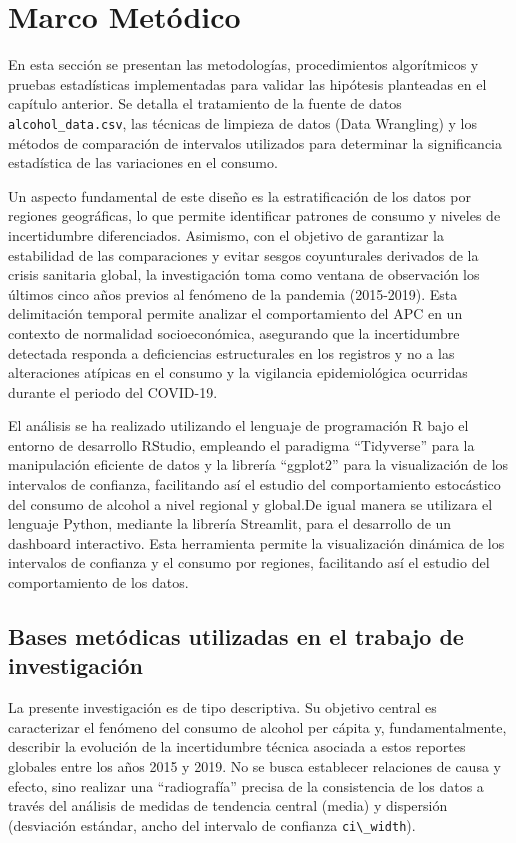 \documentclass[oneside,11pt]{Latex/Classes/PhDthesisPSnPDF}
\begin{document}
\hfill\break

\chapter{Marco Metódico}

En esta sección se presentan las metodologías, procedimientos
algorítmicos y pruebas estadísticas implementadas para validar las
hipótesis planteadas en el capítulo anterior. Se detalla el tratamiento
de la fuente de datos \texttt{alcohol\_data.csv}, las técnicas de
limpieza de datos (Data Wrangling) y los métodos de comparación de
intervalos utilizados para determinar la significancia estadística de
las variaciones en el consumo.

Un aspecto fundamental de este diseño es la estratificación de los datos
por regiones geográficas, lo que permite identificar patrones de consumo
y niveles de incertidumbre diferenciados. Asimismo, con el objetivo de
garantizar la estabilidad de las comparaciones y evitar sesgos
coyunturales derivados de la crisis sanitaria global, la investigación
toma como ventana de observación los últimos cinco años previos al
fenómeno de la pandemia (2015-2019). Esta delimitación temporal permite
analizar el comportamiento del APC en un contexto de normalidad
socioeconómica, asegurando que la incertidumbre detectada responda a
deficiencias estructurales en los registros y no a las alteraciones
atípicas en el consumo y la vigilancia epidemiológica ocurridas durante
el periodo del COVID-19.

El análisis se ha realizado utilizando el lenguaje de programación R
bajo el entorno de desarrollo RStudio, empleando el paradigma
``Tidyverse'' para la manipulación eficiente de datos y la librería
``ggplot2'' para la visualización de los intervalos de confianza,
facilitando así el estudio del comportamiento estocástico del consumo de
alcohol a nivel regional y global.De igual manera se utilizara el
lenguaje Python, mediante la librería Streamlit, para el desarrollo de
un dashboard interactivo. Esta herramienta permite la visualización
dinámica de los intervalos de confianza y el consumo por regiones,
facilitando así el estudio del comportamiento de los datos.

\section{Bases metódicas utilizadas en el trabajo de investigación}

La presente investigación es de tipo descriptiva. Su objetivo central es
caracterizar el fenómeno del consumo de alcohol per cápita y,
fundamentalmente, describir la evolución de la incertidumbre técnica
asociada a estos reportes globales entre los años 2015 y 2019. No se
busca establecer relaciones de causa y efecto, sino realizar una
``radiografía'' precisa de la consistencia de los datos a través del
análisis de medidas de tendencia central (media) y dispersión
(desviación estándar, ancho del intervalo de confianza
\texttt{ci\textbackslash{}\_width}).
\end{document}
